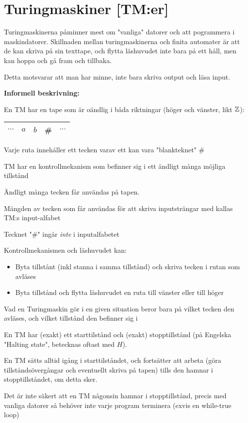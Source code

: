 \section{Turingmaskiner [TM:er]}\par
\noindent Turingmaskinerna påminner mest om "vanliga" datorer och att pogrammera i maskindatorer. Skillnaden mellan turingmaskinerna och finita automater är att de kan skriva på sin texttape, och flytta läshuvudet inte bara på ett håll, men kan hoppa och gå fram och tillbaka.\par
\noindent Detta motsvarar att man har minne, inte bara skriva output och läsa input.
\par\bigskip
\noindent\textbf{Informell beskrivning:}\par
\noindent En TM har en tape som är oändlig i båda riktningar (höger och vänster, likt $\mathbb{Z}$):
\begin{center}
  \begin{tabular}{c|c|c|c|c}
    \hline
    $\cdots$&$a$&$b$&\#&$\cdots$\\
    \hline
  \end{tabular}
\end{center}
\par\bigskip
\noindent Varje ruta innehåller ett tecken varav ett kan vara "blankteknet" \#\par
\noindent TM har en kontrollmekanism som befinner sig i ett ändligt många möjliga tillstånd\par
\noindent Ändligt många tecken får användas på tapen.
\par\bigskip
\noindent Mängden av tecken som får användas för att skriva inputsträngar med kallas TM:s input-alfabet\par
\noindent Tecknet "\#" ingår \textit{inte} i inputalfabetet\par
\noindent Kontrollmekanismen och läshuvudet kan:\par
\begin{itemize}
  \item Byta tillstånt (inkl stanna i samma tillstånd) och skriva tecken i rutan som avläses
  \item Byta tillstånd och flytta läshuvudet en ruta till vänster eller till höger
\end{itemize}\par
\noindent Vad en Turingmaskin gör i en given situation beror bara på vilket tecken den avläses, och vilket tillstånd den befinner sig i 
\par\bigskip
\noindent En TM har (exakt) ett starttilstånd och (exakt) stopptillstånd (på Engelska "Halting state", betecknas oftast med $H$). 
\par\bigskip
\noindent En TM sätts alltid igång i starttilståndet, och fortsätter att arbeta (göra tillståndsövergångar och eventuellt skriva på tapen) tills den hamnar i stopptillståndet, om detta sker.\par
\noindent Det är inte säkert att en TM någonsin hamnar i stopptillstånd, precis med vanliga datorer så behöver inte varje program terminera (exvis en while-true loop)
\par\bigskip
